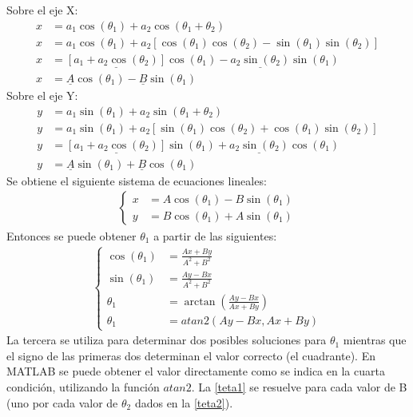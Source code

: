 \documentclass[a4paper,12pt]{article}
\begin{document}
Sobre el eje X:
\begin{align*}
    x &= a_1\cos(\theta_1) + a_2\cos(\theta_1 + \theta_2)\\
    x &= a_1\cos(\theta_1) + a_2\left[\cos(\theta_1)\cos(\theta_2) - \sin(\theta_1)\sin(\theta_2)\right]\\
    x &= \underline{\left[a_1 + a_2\cos(\theta_2)\right]}\cos(\theta_1) - \underline{a_2\sin(\theta_2)}\sin(\theta_1)\\
    x &= \underline{A}\cos(\theta_1) - \underline{B}\sin(\theta_1)
\end{align*}
Sobre el eje Y:
\begin{align*}
    y &= a_1\sin(\theta_1) + a_2\sin(\theta_1 + \theta_2)\\
    y &= a_1\sin(\theta_1) + a_2\left[\sin(\theta_1)\cos(\theta_2) + \cos(\theta_1)\sin(\theta_2)\right]\\
    y &= \underline{\left[a_1 + a_2\cos(\theta_2)\right]}\sin(\theta_1) + \underline{a_2\sin(\theta_2)}\cos(\theta_1)\\
    y &= \underline{A}\sin(\theta_1) + \underline{B}\cos(\theta_1)
\end{align*}
Se obtiene el siguiente sistema de ecuaciones lineales:
\begin{align*}
    \begin{cases}
        x &= A\cos(\theta_1) - B\sin(\theta_1)\\
        y &= B\cos(\theta_1) + A\sin(\theta_1)
    \end{cases}
\end{align*}
Entonces se puede obtener $\theta_1$ a partir de las siguientes:
\begin{align}
    \begin{cases}
        \cos(\theta_1) &= \frac{Ax + By}{A^2 + B^2}\\
        \sin(\theta_1) &= \frac{Ay - Bx}{A^2 + B^2}\\
        \theta_1 &= \arctan{\left(\frac{Ay - Bx}{Ax + By}\right)}\\
        \theta_1 &=atan2(Ay-Bx, Ax + By)
    \end{cases}
    \label{teta1}
\end{align}
La tercera se utiliza para determinar dos posibles soluciones para $\theta_1$ mientras que el signo de las primeras dos determinan el valor correcto (el cuadrante).
En MATLAB se puede obtener el valor directamente como se indica en la cuarta condición, utilizando la función $atan2$.
La \cref{teta1} se resuelve para cada valor de B (uno por cada valor de $\theta_2$ dados en la \cref{teta2}).
\end{document}

